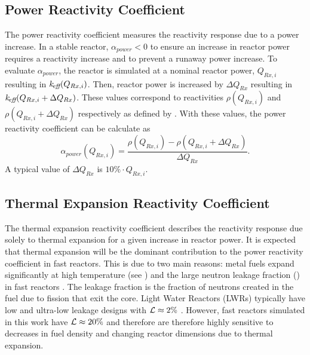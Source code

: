   \subsection{Power Reactivity Coefficient}
  \label{sec:power_reactivity_coefficient}
    The power reactivity coefficient measures the reactivity response due to a 
    power increase. In a stable reactor, $\alpha_{power} < 0$ to ensure an 
    increase in reactor power requires a reactivity increase and to prevent a 
    runaway power increase. To evaluate $\alpha_{power}$, the reactor is
    simulated at a nominal reactor power, $Q_{Rx,i}$ resulting in
    $k_{\!\mbox{\scriptsize \em eff}}(Q_{Rx,i})$. Then, reactor power is increased by $\Delta Q_{Rx}$
    resulting in $k_{\!\mbox{\scriptsize \em eff}}(Q_{Rx,i} + \Delta Q_{Rx})$. These \keff values 
    correspond to reactivities $\rho(Q_{Rx,i})$ and 
    ${\rho(Q_{Rx,i} + \Delta Q_{Rx})}$ respectively as defined by 
    . With these values, the power reactivity coefficient 
    can be calculate as
    \begin{equation}
      \label{eq:power_reactivity_coefficient}
      \alpha_{power}(Q_{Rx,i}) = \frac{\rho(Q_{Rx,i}) - \rho(Q_{Rx,i} + 
        \Delta Q_{Rx})} {\Delta Q_{Rx}}.
    \end{equation}
    A typical value of $\Delta Q_{Rx}$ is $10\% \cdot Q_{Rx,i}$.

  \subsection{Thermal Expansion Reactivity Coefficient}
  \label{sec:thermal_expansion_reactivity_coefficent}
    The thermal expansion reactivity coefficient describes the reactivity 
    response due solely to thermal expansion for a given increase in reactor 
    power. It is expected that thermal expansion will be the dominant 
    contribution to the power reactivity coefficient in fast reactors. This is 
    due to two main reasons: metal fuels expand significantly at high 
    temperature (see ) and the large neutron leakage 
    fraction (\leakage) in fast reactors \cite{PlentifulEnergy}. The leakage 
    fraction is the fraction of neutrons created in the fuel due to fission that 
    exit the core. Light Water Reactors (LWRs) typically have low and ultra-low 
    leakage designs with $\mathcal{L} \approx 2 \%$ \cite{textbookknief}. However,
    fast reactors simulated in this work have $\mathcal{L} \approx 20\%$ and 
    therefore are therefore highly sensitive to decreases in fuel density and 
    changing reactor dimensions due to thermal expansion.

